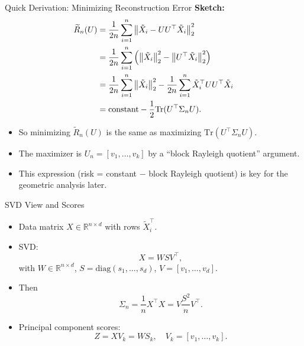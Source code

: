\documentclass{beamer}
\newcommand{\R}{\mathbb{R}}
\newcommand{\1}{\mathbbm{1}}
\begin{document}
\begin{frame}{Quick Derivation: Minimizing Reconstruction Error} %
  \small
  \textbf{Sketch:}
  \begin{align*}
    \widetilde{R}_n(U)
    &= \frac{1}{2n} \sum_{i=1}^n
    \norm{\tilde{X}_i - U U^\top \tilde{X}_i}_2^2 \\
    &= \frac{1}{2n} \sum_{i=1}^n
    \left(\norm{\tilde{X}_i}_2^2 - \norm{U^\top \tilde{X}_i}_2^2\right) \\
    &= \frac{1}{2n} \sum_{i=1}^n \norm{\tilde{X}_i}_2^2
       - \frac{1}{2n} \sum_{i=1}^n \tilde{X}_i^\top U U^\top \tilde{X}_i \\
    &= \text{constant} - \frac{1}{2} \mathrm{Tr}(U^\top \Sigma_n U).
  \end{align*}
  \vspace{0.2cm}
  \begin{itemize}
    \item So minimizing $\widetilde{R}_n(U)$ is the same as maximizing
    $\mathrm{Tr}(U^\top \Sigma_n U)$.
    \item The maximizer is $U_n = [v_1,\dots,v_k]$ by a “block Rayleigh quotient” argument.
    \item This expression (risk = constant $-$ block Rayleigh quotient) is key for the geometric analysis later.
  \end{itemize}
\end{frame}

\begin{frame}{SVD View and Scores} %
  \begin{itemize}
    \item Data matrix $X \in \R^{n\times d}$ with rows $\tilde{X}_i^\top$.
    \item SVD:
    \[
      X = W S V^\top,
    \]
    with $W \in \R^{n\times d}$, $S = \mathrm{diag}(s_1,\dots,s_d)$,
    $V = [v_1,\dots,v_d]$.
    \item Then
    \[
      \Sigma_n = \frac{1}{n} X^\top X
      = V \frac{S^2}{n} V^\top.
    \]
    \item Principal component scores:
    \[
      Z = X V_k = W S_k, \quad V_k = [v_1,\dots,v_k].
    \]
  \end{itemize}
\end{frame}
\end{document}
